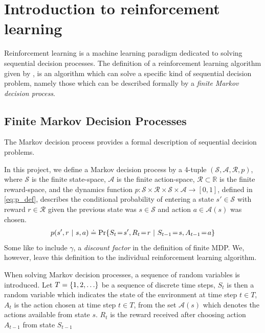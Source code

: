 \section{Introduction to reinforcement learning}
Reinforcement learning is a machine learning paradigm dedicated to solving sequential decision processes. The definition of a reinforcement learning algorithm given by \citet[chap. 3]{RLBook2018}, is an algorithm which can solve a specific kind of sequential decision problem, namely those which can be described formally by a \textit{finite Markov decision process}.


\subsection{Finite Markov Decision Processes}

The Markov decision process provides a formal description of sequential decision problems. 

In this project, we define a Markov decision process by a 4-tuple $(\mathcal{S},\mathcal{A},\mathcal{R}, p)$, where $\mathcal{S}$ is the finite state-space, $\mathcal{A}$ is the finite action-space, $\mathcal{R} \subset \mathbb{R}$ is the finite reward-space, and the dynamics function $p : \mathcal{S} \times \mathcal{R} \times \mathcal{S} \times \mathcal{A} \rightarrow [0,1]$, defined in \cref{eq:p_def}, describes the conditional probability of entering a state $s' \in \mathcal{S}$ with reward $r \in \mathcal{R}$ given the previous state was $s \in \mathcal{S}$ and action $a \in \mathcal{A}(s)$ was chosen.
\begin{align}
    \label{eq:p_def} p(s',r\ |\ s,a) \defeq \Pr{S_t\!=\!s', R_t\!=\!r\ |\ S_{t-1}\!=\!s, A_{t-1}\!=\!a}
\end{align}
Some like to include $\gamma$, a \textit{discount factor} in the definition of finite MDP. 
We, however, leave this definition to the individual reinforcement learning algorithm.


\vspace*{1em}

When solving Markov decision processes, a sequence of random variables is introduced. Let $T = \left\{1, 2, \ldots\right\}$ be a sequence of discrete time steps, $S_t$ is then a random variable which indicates the state of the environment at time step $t \in T$, $A_t$ is the action chosen at time step $t \in T$, from the set $\mathcal{A}(s)$ which denotes the actions available from state $s$. 
$R_t$ is the reward received after choosing action $A_{t-1}$ from state $S_{t-1}$

